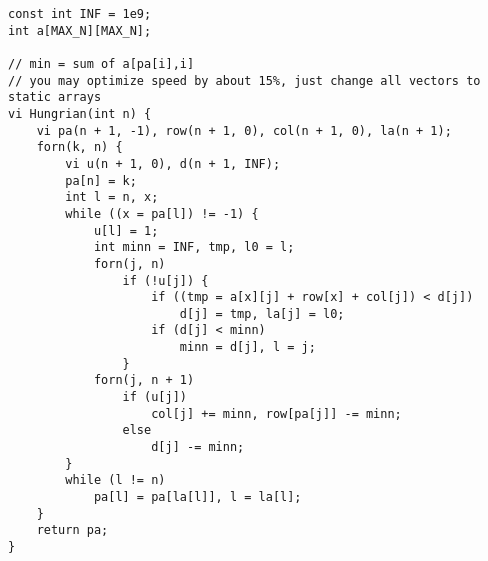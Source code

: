 \begin{verbatim}
const int INF = 1e9;
int a[MAX_N][MAX_N];

// min = sum of a[pa[i],i]
// you may optimize speed by about 15%, just change all vectors to static arrays
vi Hungrian(int n) {
	vi pa(n + 1, -1), row(n + 1, 0), col(n + 1, 0), la(n + 1);
	forn(k, n) {
		vi u(n + 1, 0), d(n + 1, INF);
		pa[n] = k;
		int l = n, x;
		while ((x = pa[l]) != -1) {
			u[l] = 1;
			int minn = INF, tmp, l0 = l;
			forn(j, n)
				if (!u[j]) {
					if ((tmp = a[x][j] + row[x] + col[j]) < d[j])
						d[j] = tmp, la[j] = l0;
					if (d[j] < minn)
						minn = d[j], l = j;
				}
			forn(j, n + 1)
				if (u[j])
					col[j] += minn, row[pa[j]] -= minn;
				else
					d[j] -= minn;
		}
		while (l != n)
			pa[l] = pa[la[l]], l = la[l];
	}
	return pa;
}
\end{verbatim}
